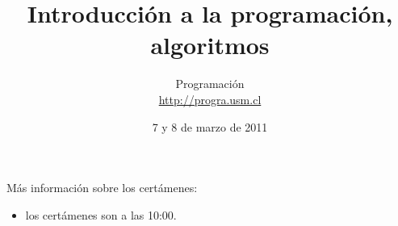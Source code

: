 \documentclass[10pt]{article}
\title{Introducción a la programación, algoritmos}
\author{Programación \\ \url{http://progra.usm.cl}}
\date{7 y 8 de marzo de 2011}
\begin{document}
  \maketitle


  Más información sobre los certámenes:
  \begin{itemize}
    \item los certámenes son a las 10:00.
  \end{itemize}
\end{document}
